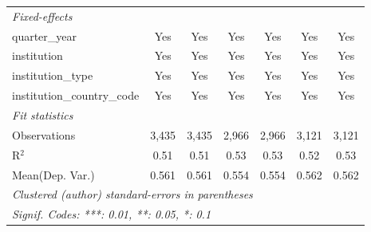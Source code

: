 \begin{tabular}{lcccccc}
   \midrule
   \emph{Fixed-effects}\\
   quarter\_year                      & Yes     & Yes           & Yes     & Yes           & Yes     & Yes\\  
   institution                        & Yes     & Yes           & Yes     & Yes           & Yes     & Yes\\  
   institution\_type                  & Yes     & Yes           & Yes     & Yes           & Yes     & Yes\\  
   institution\_country\_code         & Yes     & Yes           & Yes     & Yes           & Yes     & Yes\\  
   \midrule
   \emph{Fit statistics}\\
   Observations                       & 3,435   & 3,435         & 2,966   & 2,966         & 3,121   & 3,121\\  
   R$^2$                              & 0.51    & 0.51          & 0.53    & 0.53          & 0.52    & 0.53\\  
Mean(Dep. Var.) & 0.561 & 0.561 & 0.554 & 0.554 & 0.562 & 0.562 \\
   \midrule \midrule
   \multicolumn{7}{l}{\emph{Clustered (author) standard-errors in parentheses}}\\
   \multicolumn{7}{l}{\emph{Signif. Codes: ***: 0.01, **: 0.05, *: 0.1}}\\
\end{tabular}
\par\endgroup
